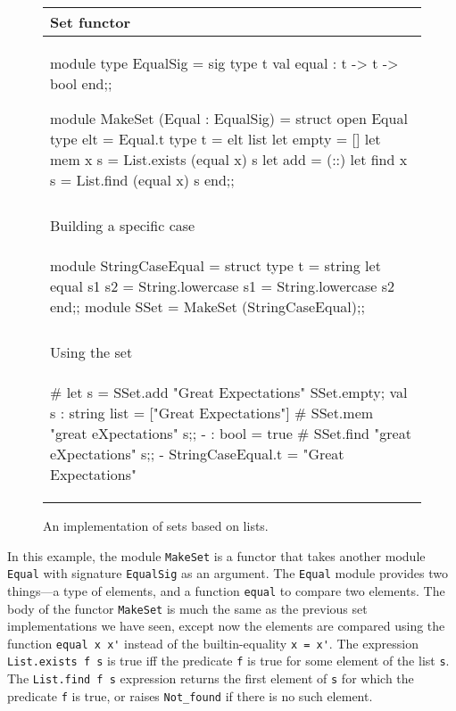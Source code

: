 \label{modules:application}
\begin{figure}
\begin{center}
\begin{tabular}[t]{l}
Set functor\\
\hline
\begin{ocamllisting}
module type EqualSig = sig
   type t
   val equal : t -> t -> bool
end;;

module MakeSet (Equal : EqualSig) = struct
   open Equal
   type elt = Equal.t
   type t = elt list
   let empty = []
   let mem x s = List.exists (equal x) s
   let add = (::)
   let find x s = List.find (equal x) s
end;;
\end{ocamllisting}\\
\\
Building a specific case\\
\hline
\begin{ocamllisting}
module StringCaseEqual = struct
   type t = string
   let equal s1 s2 =
      String.lowercase s1 = String.lowercase s2
end;;
module SSet = MakeSet (StringCaseEqual);;
\end{ocamllisting}\\
\\
Using the set\\
\hline
\begin{ocamllisting}
# let s = SSet.add "Great Expectations" SSet.empty;
val s : string list = ["Great Expectations"]
# SSet.mem "great eXpectations" s;;
- : bool = true
# SSet.find "great eXpectations" s;;
- StringCaseEqual.t = "Great Expectations"
\end{ocamllisting}
\end{tabular}
\end{center}
\caption{An implementation of sets based on lists.}
\label{page:mset1}
\end{figure}

In this example, the module \hbox{\lstinline/MakeSet/} is a functor
that takes another module \hbox{\lstinline/Equal/} with
signature \hbox{\lstinline/EqualSig/} as an
argument. The \hbox{\lstinline/Equal/} module provides two things---a
type of elements, and a function \hbox{\lstinline/equal/} to compare
two elements. The body of the functor \hbox{\lstinline/MakeSet/} is
much the same as the previous set implementations we have seen, except
now the elements are compared using the
function \hbox{\lstinline/equal x x'/} instead of the builtin-equality
%
\hbox{\lstinline/x = x'/}.
%
The expression \hbox{\lstinline$List.exists f s$} is true iff the
predicate \hbox{\lstinline/f/} is true for some element of the list \hbox{\lstinline/s/}.
The \hbox{\lstinline$List.find f s$} expression returns the first
element of \hbox{\lstinline/s/} for which the predicate \hbox{\lstinline/f/} is true, or
raises \hbox{\lstinline$Not_found$} if there is no such element.

